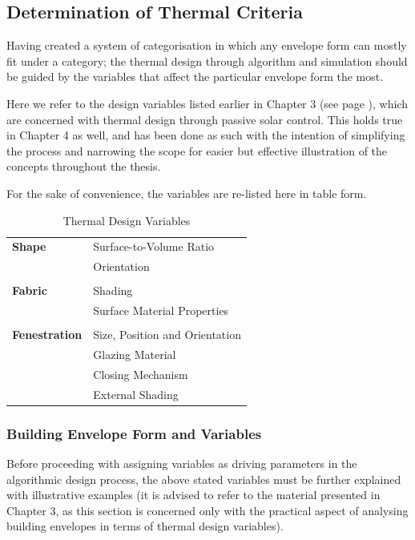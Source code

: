 \subsection{Determination of Thermal Criteria}

Having created a system of categorisation in which any envelope form can mostly fit under a category; the thermal design through algorithm and simulation should be guided by the variables that affect the particular envelope form the most.

Here we refer to the design variables listed earlier in Chapter 3 (see page \pageref{sec:ThermalDesignVariables}), which are concerned with thermal design through passive solar control. This holds true in Chapter 4 as well, and has been done as such with the intention of simplifying the process and narrowing the scope for easier but effective illustration of the concepts throughout the thesis.

For the sake of convenience, the variables are re-listed here in table form.

\begin{table}[H]
	\centering
	\begin{tabular}{l|l}
		\textbf{Shape}		&Surface-to-Volume Ratio\\
					&Orientation\\
					&\\
		\textbf{Fabric} 	&Shading\\
					&Surface Material Properties\\
					&\\
		\textbf{Fenestration}	&Size, Position and Orientation\\
					&Glazing Material\\
					&Closing Mechanism\\
					&External Shading\\
	\end{tabular}
	\caption{Thermal Design Variables}
	\label{tab:ThermalDesignVariables}
\end{table}

\subsubsection{Building Envelope Form and Variables}

Before proceeding with assigning variables as driving parameters in the algorithmic design process, the above stated variables must be further explained with illustrative examples (it is advised to refer to the material presented in Chapter 3, as this section is concerned only with the practical aspect of analysing building envelopes in terms of thermal design variables).

